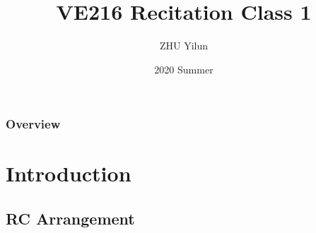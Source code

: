 \documentclass{beamer}
\title[VE216]{VE216 Recitation Class 1} %
\author{ZHU Yilun} %
\institute[SJTU] %
{
UM-SJTU Joint Institute \\ %
\medskip
\textit{VE216 SU20 Teaching Group} %
}
\date{2020 Summer} %
\begin{document}
\begin{frame}
\titlepage %
\end{frame}

\begin{frame}
\frametitle{Overview} %
\tableofcontents %
\end{frame}


\section{Introduction} %

\subsection{RC Arrangement} %
\end{document}
